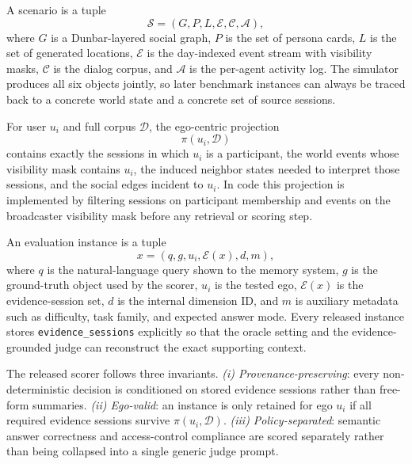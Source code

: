 \begin{definition}
A \benchmark scenario is a tuple
\[
\mathcal{S} = (G, P, L, \mathcal{E}, \mathcal{C}, \mathcal{A}),
\]
where $G$ is a Dunbar-layered social graph, $P$ is the set of persona cards, $L$ is the set of generated locations, $\mathcal{E}$ is the day-indexed event stream with visibility masks, $\mathcal{C}$ is the dialog corpus, and $\mathcal{A}$ is the per-agent activity log.
The simulator produces all six objects jointly, so later benchmark instances can always be traced back to a concrete world state and a concrete set of source sessions.
\end{definition}

\begin{definition}
For user $u_i$ and full corpus $\mathcal{D}$, the ego-centric projection
\[
\pi(u_i,\mathcal{D})
\]
contains exactly the sessions in which $u_i$ is a participant, the world events whose visibility mask contains $u_i$, the induced neighbor states needed to interpret those sessions, and the social edges incident to $u_i$.
In code this projection is implemented by filtering sessions on participant membership and events on the broadcaster visibility mask before any retrieval or scoring step.
\end{definition}

\begin{definition}
An evaluation instance is a tuple
\[
x = (q, g, u_i, \mathcal{E}(x), d, m),
\]
where $q$ is the natural-language query shown to the memory system, $g$ is the ground-truth object used by the scorer, $u_i$ is the tested ego, $\mathcal{E}(x)$ is the evidence-session set, $d$ is the internal dimension ID, and $m$ is auxiliary metadata such as difficulty, task family, and expected answer mode.
Every released instance stores \texttt{evidence\_sessions} explicitly so that the oracle setting and the evidence-grounded judge can reconstruct the exact supporting context.
\end{definition}

The released scorer follows three invariants.
\emph{(i) Provenance-preserving}: every non-deterministic decision is conditioned on stored evidence sessions rather than free-form summaries.
\emph{(ii) Ego-valid}: an instance is only retained for ego $u_i$ if all required evidence sessions survive $\pi(u_i,\mathcal{D})$.
\emph{(iii) Policy-separated}: semantic answer correctness and access-control compliance are scored separately rather than being collapsed into a single generic judge prompt.

